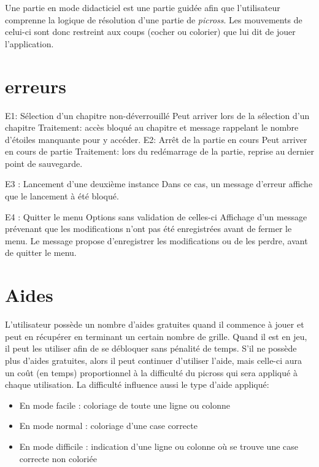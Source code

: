 \documentclass{report}
\begin{document}
	Une partie en mode didacticiel est une partie guidée afin que l'utilisateur comprenne la logique de résolution d'une partie de \textit{picross}. Les mouvements de celui-ci sont donc restreint aux coups (cocher ou colorier) que lui dit de jouer l'application.
	

	\section{erreurs}
	
		E1: Sélection d'un chapitre non-déverrouillé
			Peut arriver lors de la sélection d'un chapitre
			Traitement: accès bloqué au chapitre et message rappelant le nombre d'étoiles manquante pour y accéder.
		E2: Arrêt de la partie en cours
			Peut arriver en cours de partie
			Traitement: lors du redémarrage de la partie, reprise au dernier point de sauvegarde.
		
                E3 : Lancement d'une deuxième instance
                        Dans ce cas, un message d'erreur affiche que le lancement à été bloqué.

                E4 : Quitter le menu Options sans validation de celles-ci
                         Affichage d'un message prévenant que les modifications n'ont pas été enregistrées avant de   fermer le menu. Le message propose d'enregistrer les modifications ou de les perdre, avant de quitter le menu.
	
			
  \section{Aides}

  L'utilisateur possède un nombre d'aides gratuites quand il commence à jouer et peut en récupérer en terminant un certain nombre de grille. Quand il est en jeu, il peut les utiliser afin de se débloquer sans pénalité de temps. S'il ne possède plus d'aides gratuites, alors il peut continuer d'utiliser l'aide, mais celle-ci aura un coût (en temps) proportionnel à la difficulté du picross qui sera appliqué à chaque utilisation. La difficulté influence aussi le type d'aide appliqué:
    \begin{itemize}
    \item En mode facile : coloriage de toute une ligne ou colonne
    \item En mode normal : coloriage d'une case correcte 
    \item En mode difficile : indication d'une ligne ou colonne où se trouve une case correcte non coloriée
    \end{itemize}
\end{document}

